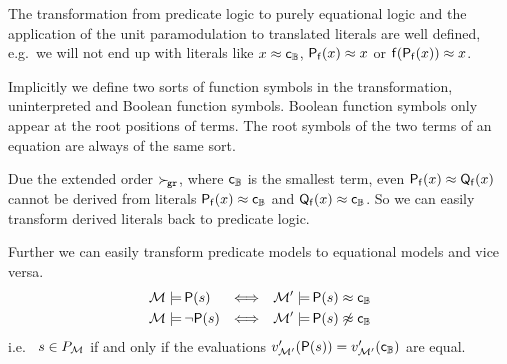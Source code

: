     \begin{remark}
        The transformation from predicate logic
        to purely equational logic
        and the application of the unit para\-modulation
        to translated literals are well defined,
        e.g.\ we will not end up with literals like
        \( x \approx {\mathsf{c}}_{\mathbb{B}} \),
        \( \mathsf{P}_{\mathsf{f}}(x) \approx x \) or
        \( \mathsf{f}(\mathsf{P}_{\mathsf{f}}(x)) \approx x \).

        Implicitly we define two sorts of function symbols in the transformation,
        uninterpreted and Boolean function symbols.
        Boolean function symbols only appear at the root positions of terms.
        The root symbols of the two terms of an equation are always of the same sort.

        Due the extended order \( \mathrel\succ_{\!\mathtt{gr}} \), where
        \( {\mathsf{c}}_{\mathbb{B}} \) is the smallest term,
        even \( \mathsf{P}_{\mathsf{f}}(x) \approx \mathsf{Q}_{\mathsf{f}}(x) \) cannot be derived from
        literals \( \mathsf{P}_{\mathsf{f}}(x) \approx {\mathsf{c}}_{\mathbb{B}} \) and \(\mathsf{Q}_{\mathsf{f}}(x) \approx {\mathsf{c}}_{\mathbb{B}} \). So we can easily transform derived literals back to predicate logic.

        Further we can easily transform predicate models to equational models and vice versa.
        \begin{align*}
            \mathcal{M}\models&\,\mathsf{P}(s)
            &\Longleftrightarrow&&
            \mathcal{M}'\models&\,\mathsf{P}(s)\approx {\mathsf{c}}_{\mathbb{B}}
            \\
            \mathcal{M}\models&\,\lnot\mathsf{P}(s)
            &\Longleftrightarrow&&
            \mathcal{M}'\models&\,\mathsf{P}(s)\not\approx {\mathsf{c}}_{\mathbb{B}}
        \end{align*}
        i.e.\ %
        \( s\in P_{\mathcal{M}} \) if and only if the evaluations
        \( v'_{\mathcal{M}'}(\mathsf{P}(s)) = v'_{\mathcal{M}'}({\mathsf{c}}_{\mathbb{B}}) \) are equal.
    \end{remark}














